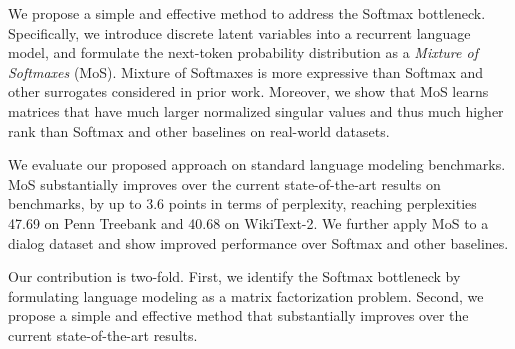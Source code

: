 We propose a simple and effective method to address the Softmax bottleneck. Specifically, we introduce discrete latent variables into a recurrent language model, and formulate the next-token probability distribution as a {\em Mixture of Softmaxes} (MoS). Mixture of Softmaxes is more expressive than Softmax and other surrogates considered in prior work. Moreover, we show that MoS learns matrices that have much larger normalized singular values and thus much higher rank than Softmax and other baselines on real-world datasets.

We evaluate our proposed approach on standard language modeling benchmarks. MoS substantially improves over the current state-of-the-art results on benchmarks, by up to 3.6 points in terms of perplexity, reaching perplexities 47.69 on Penn Treebank and 40.68 on WikiText-2. We further apply MoS to a dialog dataset and show improved performance over Softmax and other baselines.

Our contribution is two-fold. First, we identify the Softmax bottleneck by formulating language modeling as a matrix factorization problem. Second, we propose a simple and effective method that substantially improves over the current state-of-the-art results.
